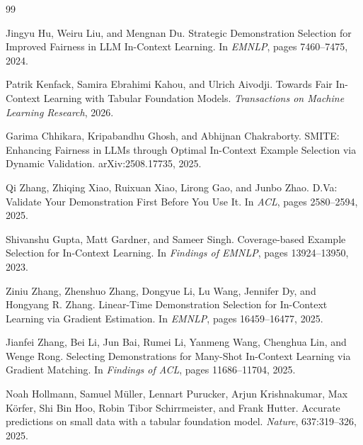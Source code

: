 \documentclass[10pt]{article}
\begin{document}
\begin{thebibliography}{99}

Jingyu Hu, Weiru Liu, and Mengnan Du.
\newblock Strategic Demonstration Selection for Improved Fairness in LLM In-Context Learning.
\newblock In \emph{EMNLP}, pages 7460--7475, 2024.

Patrik Kenfack, Samira Ebrahimi Kahou, and Ulrich Aivodji.
\newblock Towards Fair In-Context Learning with Tabular Foundation Models.
\newblock \emph{Transactions on Machine Learning Research}, 2026.

Garima Chhikara, Kripabandhu Ghosh, and Abhijnan Chakraborty.
\newblock SMITE: Enhancing Fairness in LLMs through Optimal In-Context Example Selection via Dynamic Validation.
\newblock arXiv:2508.17735, 2025.

Qi Zhang, Zhiqing Xiao, Ruixuan Xiao, Lirong Gao, and Junbo Zhao.
\newblock D.Va: Validate Your Demonstration First Before You Use It.
\newblock In \emph{ACL}, pages 2580--2594, 2025.

Shivanshu Gupta, Matt Gardner, and Sameer Singh.
\newblock Coverage-based Example Selection for In-Context Learning.
\newblock In \emph{Findings of EMNLP}, pages 13924--13950, 2023.

Ziniu Zhang, Zhenshuo Zhang, Dongyue Li, Lu Wang, Jennifer Dy, and Hongyang R. Zhang.
\newblock Linear-Time Demonstration Selection for In-Context Learning via Gradient Estimation.
\newblock In \emph{EMNLP}, pages 16459--16477, 2025.

Jianfei Zhang, Bei Li, Jun Bai, Rumei Li, Yanmeng Wang, Chenghua Lin, and Wenge Rong.
\newblock Selecting Demonstrations for Many-Shot In-Context Learning via Gradient Matching.
\newblock In \emph{Findings of ACL}, pages 11686--11704, 2025.

Noah Hollmann, Samuel M{\"u}ller, Lennart Purucker, Arjun Krishnakumar, Max K{\"o}rfer, Shi Bin Hoo, Robin Tibor Schirrmeister, and Frank Hutter.
\newblock Accurate predictions on small data with a tabular foundation model.
\newblock \emph{Nature}, 637:319--326, 2025.


\end{thebibliography}
\end{document}
